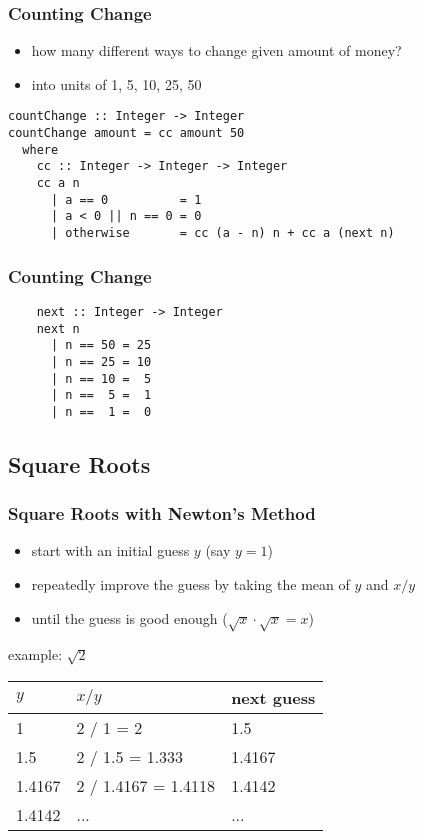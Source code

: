 \documentclass[dvipsnames]{beamer}
\theoremstyle{plain}
\begin{document}
\begin{frame}[fragile]
  \frametitle{Counting Change}

  \begin{itemize}
    \item how many different ways to change given amount of money?
    \item into units of 1, 5, 10, 25, 50
  \end{itemize}

  \begin{lstlisting}
countChange :: Integer -> Integer
countChange amount = cc amount 50
  where
    cc :: Integer -> Integer -> Integer
    cc a n
      | a == 0          = 1
      | a < 0 || n == 0 = 0
      | otherwise       = cc (a - n) n + cc a (next n)
  \end{lstlisting}
\end{frame}

\begin{frame}[fragile]
  \frametitle{Counting Change}

  \begin{lstlisting}
    next :: Integer -> Integer
    next n
      | n == 50 = 25
      | n == 25 = 10
      | n == 10 =  5
      | n ==  5 =  1
      | n ==  1 =  0
  \end{lstlisting}
\end{frame}

\subsection{Square Roots}

\lstset{deletekeywords=sqrt}

\begin{frame}
  \frametitle{Square Roots with Newton's Method}

  \begin{itemize}
    \item start with an initial guess $y$ (say $y = 1$)
    \item repeatedly improve the guess by taking the mean of $y$
      and $x / y$
    \item until the guess is good enough ($\sqrt x \cdot \sqrt x = x$)
  \end{itemize}

  \medskip
  \begin{exampleblock}{example: $\sqrt{2}$}
    \begin{center}
      \begin{tabular}{lll}
      $y$      & $x / y$             & next guess\\\hline
      1        & 2 / 1 = 2           & 1.5\\
      1.5      & 2 / 1.5 = 1.333     & 1.4167\\
      1.4167   & 2 / 1.4167 = 1.4118 & 1.4142\\
      1.4142   & ...                 & ...
      \end{tabular}
    \end{center}
  \end{exampleblock}
\end{frame}
\end{document}
